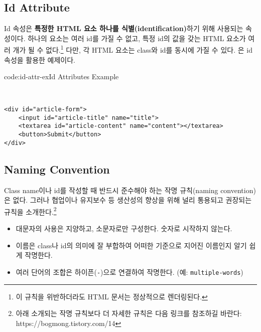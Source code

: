 \subsection*{Id Attribute}
Id 속성은 \textbf{특정한 HTML 요소 하나를 식별(identification)}하기 위해 사용되는 속성이다. 하나의 요소는 여러 id를 가질 수 없고, 특정 id의 값을 갖는 HTML 요소가 여러 개가 될 수 없다.\footnote{이 규칙을 위반하더라도 HTML 문서는 정상적으로 렌더링된다.} 다만, 각 HTML 요소는 class와 id를 동시에 가질 수 있다. 은 id 속성을 활용한 예제이다.

\begin{codeenv}{code:id-attr-ex}{Id Attributes Example}\begin{verbatim}


<div id="article-form">
    <input id="article-title" name="title">
    <textarea id="article-content" name="content"></textarea>
    <button>Submit</button>
</div>
\end{verbatim}
\end{codeenv}

\subsection*{Naming Convention}
Class name이나 id를 작성할 때 반드시 준수해야 하는 작명 규칙(naming convention)은 없다. 그러나 협업이나 유지보수 등 생산성의 향상을 위해 널리 통용되고 권장되는 규칙을 소개한다.\footnote{아래 소개되는 작명 규칙보다 더 자세한 규칙은 다음 링크를 참조하길 바란다: https://bogmong.tistory.com/14}

\begin{itemize}
    \item 대문자의 사용은 지양하고, 소문자로만 구성한다. 숫자로 시작하지 않는다.
    \item 이름은 class나 id의 의미에 잘 부합하여 어떠한 기준으로 지어진 이름인지 알기 쉽게 작명한다.
    \item 여러 단어의 조합은 하이픈(\texttt{-})으로 연결하여 작명한다. (예: \texttt{multiple-words})
\end{itemize}
